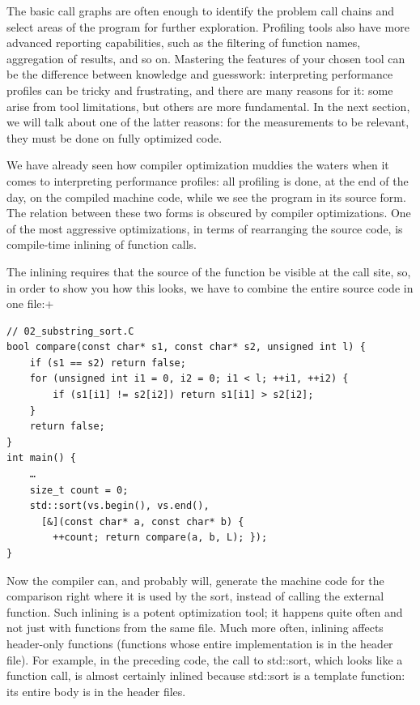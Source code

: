 The basic call graphs are often enough to identify the problem call chains and select areas of the program for further exploration. Profiling tools also have more advanced reporting capabilities, such as the filtering of function names, aggregation of results, and so on. Mastering the features of your chosen tool can be the difference between knowledge and guesswork: interpreting performance profiles can be tricky and frustrating, and there are many reasons for it: some arise from tool limitations, but others are more fundamental. In the next section, we will talk about one of the latter reasons: for the measurements to be relevant, they must be done on fully optimized code.


We have already seen how compiler optimization muddies the waters when it comes to interpreting performance profiles: all profiling is done, at the end of the day, on the compiled machine code, while we see the program in its source form. The relation between these two forms is obscured by compiler optimizations. One of the most aggressive optimizations, in terms of rearranging the source code, is compile-time inlining of function calls.

The inlining requires that the source of the function be visible at the call site, so, in order to show you how this looks, we have to combine the entire source code in one file:+

\begin{lstlisting}[style=styleCXX]
// 02_substring_sort.C
bool compare(const char* s1, const char* s2, unsigned int l) {
	if (s1 == s2) return false;
	for (unsigned int i1 = 0, i2 = 0; i1 < l; ++i1, ++i2) {
		if (s1[i1] != s2[i2]) return s1[i1] > s2[i2];
	}
	return false;
}
int main() {
	…
	size_t count = 0;
	std::sort(vs.begin(), vs.end(),
	  [&](const char* a, const char* b) {
		++count; return compare(a, b, L); });
}
\end{lstlisting}

Now the compiler can, and probably will, generate the machine code for the comparison right where it is used by the sort, instead of calling the external function. Such inlining is a potent optimization tool; it happens quite often and not just with functions from the same file. Much more often, inlining affects header-only functions (functions whose entire implementation is in the header file). For example, in the preceding code, the call to std::sort, which looks like a function call, is almost certainly inlined because std::sort is a template function: its entire body is in the header files.


